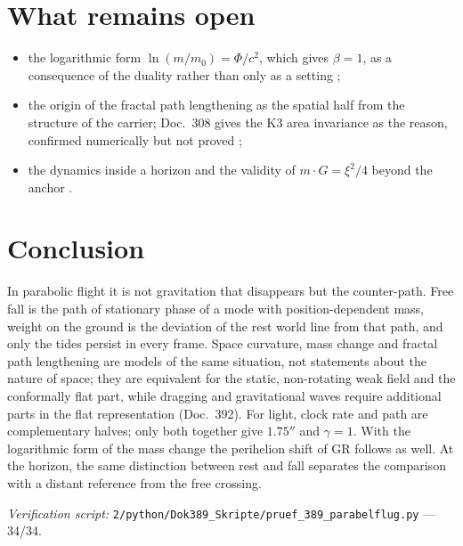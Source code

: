 \section{What remains open}

\begin{itemize}[leftmargin=*,itemsep=1pt]
\item the logarithmic form $\ln(m/m_0)=\Phi/c^2$, which gives $\beta=1$, as a consequence of the
duality rather than only as a setting \SM;
\item the origin of the fractal path lengthening as the spatial half from the structure of the
carrier; Doc.~308 gives the K3 area invariance as the reason, confirmed numerically but not proved
\KM;
\item the dynamics inside a horizon and the validity of $m\cdot G=\xi^2/4$ beyond the anchor \SM.
\end{itemize}

\section{Conclusion}

In parabolic flight it is not gravitation that disappears but the counter-path. Free fall is the
path of stationary phase of a mode with position-dependent mass, weight on the ground is the
deviation of the rest world line from that path, and only the tides persist in every frame. Space
curvature, mass change and fractal path lengthening are models of the same situation, not statements
about the nature of space; they are equivalent for the static, non-rotating weak field and the
conformally flat part, while dragging and gravitational waves require additional parts in the flat
representation (Doc.~392). For light, clock rate and path are complementary halves;
only both together give $1.75''$ and $\gamma=1$. With the logarithmic form of the mass change the
perihelion shift of GR follows as well. At the horizon, the same distinction between rest and fall
separates the comparison with a distant reference from the free crossing.

\vspace{1em}
\noindent\textit{Verification script:} \texttt{2/python/Dok389\_Skripte/pruef\_389\_parabelflug.py}
--- 34/34.
